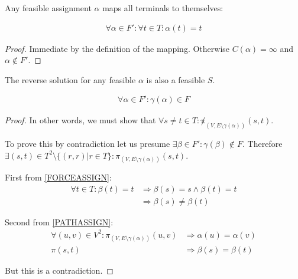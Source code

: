 \documentclass{article}
\begin{document}
\begin{lemma}
\label{FORCEASSIGN}
Any feasible assignment $\alpha$ maps all terminals to themselves:

\begin{align}
	\nonumber \forall \alpha \in F' : \forall t \in T : \alpha(t) = t
\end{align}
\end{lemma}
\begin{proof}
Immediate by the definition of the mapping.
Otherwise $C(\alpha) = \infty$ and $\alpha \not\in F'$.
\end{proof}

\begin{lemma}
\label{REVERSEFEASABLE}
The reverse solution for any feasible $\alpha$ is also a feasible $S$.

\begin{align}
	\nonumber \forall \alpha \in F' : \gamma(\alpha) \in F
\end{align}
\end{lemma}
\begin{proof}
In other words, we must show that $\forall s \neq t \in T : \not\pi_{(V, E \setminus \gamma(\alpha))}(s, t)$.

To prove this by contradiction let us presume $\exists \beta \in F' : \gamma(\beta) \not\in F$.
Therefore $\exists (s, t) \in T^2 \setminus \{(r,r) | r \in T\} : \pi_{(V, E \setminus \gamma(\alpha))}(s, t)$.

First from \ref{FORCEASSIGN}:
\begin{align}
	\nonumber \forall t \in T : \beta(t) = t & \Rightarrow \beta(s) = s \wedge \beta(t) = t \\
	\nonumber & \Rightarrow \beta(s) \neq \beta(t)
\end{align}

Second from \ref{PATHASSIGN}:
\begin{align}
	\nonumber \forall (u, v) \in V^2 : \pi_{(V, E \setminus \gamma(\alpha))}(u,v) & \Rightarrow \alpha(u) = \alpha(v) \\
	\nonumber \pi(s, t) & \Rightarrow \beta(s) = \beta(t)
\end{align}

But this is a contradiction.
\end{proof}

%
\end{document}
